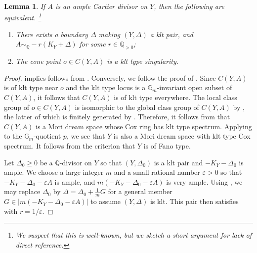 \documentclass[11pt,leqno]{amsart}
\numberwithin{equation}{section}
\newtheorem{lemma}[theorem]{Lemma}
\theoremstyle{definition}
\theoremstyle{remark}
\newcommand{\Q}{\mathbb{Q}}
\newcommand{\vare}{\varepsilon}
\newcommand{\G}{\mathbb{G}}
\begin{document}
 

\begin{lemma} \label{lem: log_fanovsklt_type}
If $A$ is an ample Cartier divisor on $Y$, then the following are equivalent. \footnote{We suspect that this is well-known, but we sketch a short argument for lack of direct reference.}
\begin{enumerate}[ref=(\arabic*)]
\item\label{lem: log_fanovsklt_type1} There exists a boundary $\Delta$ making $(Y, \Delta)$ a klt pair, and $A \sim_\Q -r(K_Y + \Delta)$ for some $r \in \Q_{> 0}$;
\item\label{lem: log_fanovsklt_type2}  The cone point $ o \in C(Y, A) $ is a klt type singularity.
\end{enumerate}  
\end{lemma}
\begin{proof}
 implies  follows from \cite[Lemma 3.1]{kollarsings}. Conversely, we follow the proof of \cite[Corollary 3]{BGLM24}. Since $C(Y, A)$ is of klt type near $o$ and the klt type locus is a $\G_m$-invariant open subset of $C(Y, A)$, it follows that $C(Y, A)$ is of klt type everywhere. The local class group of $o \in C(Y, A)$ is isomorphic to the global class group of $C(Y, A)$ by \cite[Lemma 2.10]{BM24}, the latter of which is finitely generated by \cite[Proposition 2.12]{BGLM24}. Therefore, it follows from \cite[Proposition 2.14]{BGLM24} that $C(Y, A)$ is a Mori dream space whose Cox ring has klt type spectrum. Applying \cite[Theorem 6]{BGLM24} to the $\G_m$-quotient $p$, we see that $Y$ is also a Mori dream space with klt type Cox spectrum. It follows from the criterion \cite[Corollary 5.3]{GOST15} that $Y$ is of Fano type.

Let $\Delta_0 \geq 0$ be a $\Q$-divisor on $Y$ so that $(Y, \Delta_0)$ is a klt pair and $-K_Y - \Delta_0$ is ample. We choose a large integer $m$ and a small rational number $\vare > 0$ so that $-K_Y- \Delta_0 - \vare A$ is ample, and $m(-K_Y - \Delta_0 - \vare A)$ is very ample. Using \cite[Theorem 4.8]{kollar97singsofpairs}, we may replace $\Delta_0$ by $\Delta = \Delta_0 + \frac{1}{m}G$ for a general member $G \in |m(-K_Y- \Delta_0 - \vare A)|$ to assume $(Y, \Delta)$ is klt. This pair then satisfies  with $r = 1/\vare$. 
\end{proof}
\end{document}
